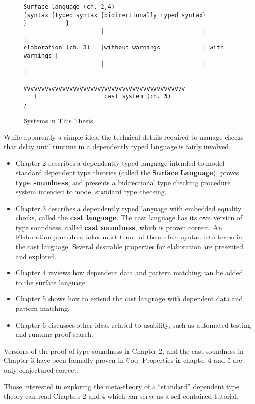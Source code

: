 \begin{figure}
\begin{lstlisting}[basicstyle={\ttfamily\tiny}]
Surface language (ch. 2,4)
{syntax {typed syntax {bidirectionally typed syntax}       }           }
                      |                            |               |
elaboration (ch. 3)   |without warnings            | with warnings |
                      |                            |               |
                      vvvvvvvvvvvvvvvvvvvvvvvvvvvvvvvvvvvvvvvvvvvvvv
   {                   cast system (ch. 3)                             }

\end{lstlisting}


\caption{Systems in This Thesis}
\label{fig:intro-thesis-workflow-1}
\end{figure}

While apparently a simple idea, the technical details required to manage checks that delay until runtime in a dependently typed language is fairly involved.

\begin{itemize}
\item Chapter 2 describes a dependently typed language intended to model standard dependent type theories (called the\textbf{ Surface Language}), proves \textbf{type soundness}, and presents a bidirectional type checking procedure system intended to model standard type checking.
\item Chapter 3 describes a dependently typed language with embedded equality checks, called the \textbf{cast language}.
The cast language has its own version of type soundness, called \textbf{cast soundness}, which is proven correct.
An Elaboration procedure takes most terms of the surface syntax into terms in the cast language.
Several desirable properties for elaboration are presented and explored.
\item Chapter 4 reviews how dependent data and pattern matching can be added to the surface language.
\item Chapter 5 shows how to extend the cast language with dependent data and pattern matching.
\item Chapter 6 discusses other ideas related to usability, such as automated testing and runtime proof search.
\end{itemize}
Versions of the proof of type soundness in Chapter 2, and the cast soundness in Chapter 3 have been formally proven in Coq.
Properties in chapter 4 and 5 are only conjectured correct.

Those interested in exploring the meta-theory of a ``standard'' dependent type theory can read Chapters 2 and 4 which can serve as a self contained tutorial.

% 
% 

 
